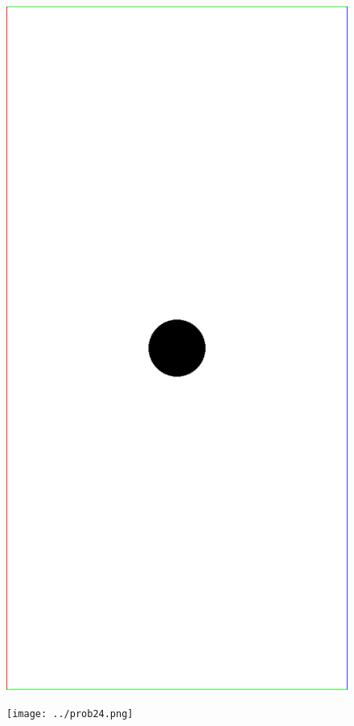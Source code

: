 \documentclass{article}
\begin{document}
\begin{figure}[H]
\centering
\begin{minipage}{.5\textwidth}
  \centering
  \includegraphics[width=.5\linewidth]{../prob1HR.png}
  \label{fig:1}
\end{minipage}%
\begin{minipage}{.5\textwidth}
  \centering
  \texttt{[image: ../prob24.png]}
  \label{fig:24}
\end{minipage}
\end{figure}
\end{document}
